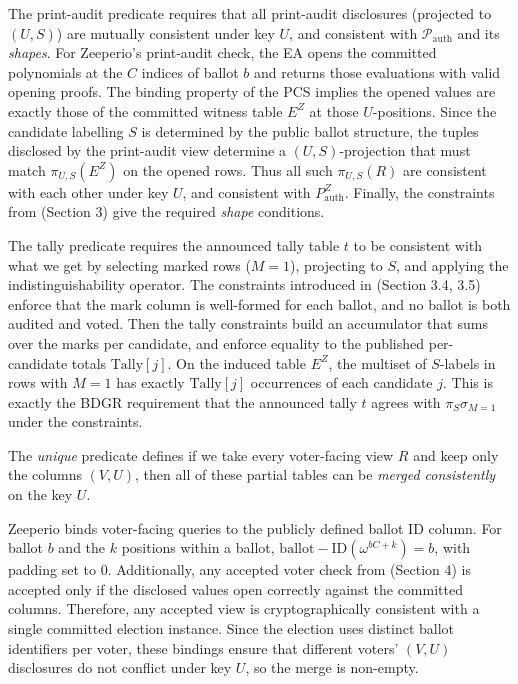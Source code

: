 The print-audit predicate requires that all print-audit disclosures (projected to $(U,S)$) are mutually consistent under key $U$, and consistent with $\mathcal{P}_{\mathrm{auth}}$ and its \emph{shapes}.
For Zeeperio’s print-audit check, the EA opens the committed polynomials at the $C$ indices of ballot $b$ and returns those evaluations with valid opening proofs.
The binding property of the PCS implies the opened values are exactly those of the committed witness table $E^Z$ at those $U$-positions.
Since the candidate labelling $S$ is determined by the public ballot structure, the tuples disclosed by the print-audit view determine a $(U,S)$-projection that must match $\pi_{U,S}(E^Z)$ on the opened rows. 
Thus all such $\pi_{U,S}(R)$ are consistent with each other under key $U$, and consistent with $P_{\mathrm{auth}}^{Z}$.
Finally, the constraints from (Section 3) give the required \emph{shape} conditions.


The tally predicate requires the announced tally table $t$ to be consistent with what we get by selecting marked rows ($M=1$), projecting to $S$, and applying the indistinguishability operator.
The constraints introduced in (Section 3.4, 3.5) enforce that the mark column is well-formed for each ballot, and no ballot is both audited and voted.
Then the tally constraints build an accumulator that sums over the marks per candidate, and enforce equality to the published per-candidate totals $\mathrm{Tally}[j]$.
On the induced table $E^Z$, the multiset of $S$-labels in rows with $M=1$ has exactly $\mathrm{Tally}[j]$ occurrences of each candidate $j$.
This is exactly the BDGR requirement that the announced tally $t$ agrees with $\pi_S\sigma_{M=1}$ under the constraints. 


The \emph{unique} predicate defines if we take every voter-facing view $R$ and keep only the
columns $(V,U)$, then all of these partial tables can be \emph{merged consistently} on the key $U$.

Zeeperio binds voter-facing queries to the publicly defined ballot ID column.
For ballot $b$ and the $k$ positions within a ballot, $\mathrm{ballot-ID}(\omega^{bC+k})=b$, with padding set to $0$. 
Additionally, any accepted voter check from (Section 4) is accepted only if the disclosed values open correctly against the committed columns.
Therefore, any accepted view is cryptographically consistent with a single committed election instance.
Since the election uses distinct ballot identifiers per voter, these bindings ensure that different voters’ $(V,U)$ disclosures do not conflict under key $U$, so the merge is non-empty.

